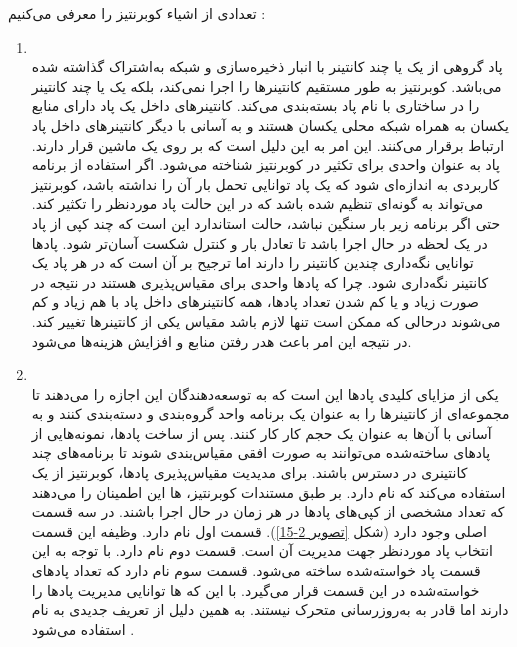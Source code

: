 تعدادی از اشیاء کوبرنتیز را معرفی می‌کنیم \cite{sanche_2018}:
\begin{enumerate}
	\item
	\\
	پاد گروهی از یک یا چند کانتینر با انبار ذخیره‌سازی  و شبکه به‌اشتراک‌ گذاشته‌ شده می‌باشد. کوبرنتیز به طور مستقیم کانتینرها را اجرا نمی‌کند، بلکه یک یا چند کانتینر را  در ساختاری با نام پاد بسته‌بندی می‌کند. کانتینرهای داخل یک پاد دارای منابع یکسان به همراه شبکه محلی یکسان هستند و به آسانی با دیگر کانتینرهای داخل پاد ارتباط برقرار می‌کنند. این امر به این دلیل است که بر روی یک ماشین قرار دارند. پاد به عنوان واحدی برای تکثیر در کوبرنتیز شناخته می‌شود. اگر استفاده از برنامه کاربردی به اندازه‌ای شود که یک پاد توانایی تحمل بار آن را نداشته باشد، کوبرنتیز می‌تواند به گونه‌ای تنظیم شده باشد که در این حالت پاد موردنظر را تکثیر کند. حتی اگر برنامه‌ زیر بار سنگین نباشد، حالت استاندارد این است که چند کپی از پاد در یک لحظه در حال اجرا باشد تا تعادل بار و کنترل شکست آسان‌تر شود.
	پادها توانایی نگه‌داری چندین کانتینر را دارند اما ترجیح بر آن است که در هر پاد یک کانتینر نگه‌داری شود. چرا که پادها واحدی برای مقیاس‌پذیری هستند در نتیجه در صورت زیاد و یا کم‌ شدن تعداد پادها، همه کانتینرهای داخل پاد با هم زیاد و کم می‌شوند در‌حالی که ممکن است تنها لازم باشد مقیاس یکی از کانتینرها تغییر کند. در نتیجه این امر باعث هدر رفتن منابع و افزایش هزینه‌ها می‌شود. 
	
	\item
	\\
	یکی از مزایای کلیدی پادها این است که به توسعه‌دهندگان این اجازه را می‌دهند تا مجموعه‌ای از کانتینرها را به عنوان یک برنامه واحد گروه‌بندی و دسته‌بندی کنند و به آسانی با آن‌ها به عنوان یک حجم کار  کار کنند. پس از ساخت پادها، نمونه‌هایی از پادهای ساخته‌شده می‌توانند به صورت افقی مقیاس‌بندی شوند تا برنامه‌های چند کانتینری در دسترس باشند. برای مدیدیت مقیاس‌پذیری پادها، کوبرنتیز از یک  استفاده می‌کند که  نام دارد.
	بر طبق مستندات کوبرنتیز،  ها این اطمینان را می‌دهند که تعداد مشخصی از کپی‌های پادها در هر زمان در حال اجرا باشند. 
	در 	 سه قسمت اصلی وجود دارد (شکل \ref{تصویر 2-15}). قسمت اول  نام دارد. وظیفه این قسمت انتخاب پاد موردنظر جهت مدیریت آن است. قسمت دوم 	نام دارد.		با توجه به این قسمت پاد خواسته‌شده ساخته می‌شود. قسمت سوم		نام دارد که تعداد پادهای خواسته‌شده در این قسمت قرار می‌گیرد. با این که		ها توانایی مدیریت پادها را دارند اما قادر به به‌روز‌رسانی متحرک نیستند. به همین دلیل از تعریف جدیدی به نام  استفاده می‌شود \cite{nirmata_ReplicaSetsAndDeployments}.
	

\end{enumerate}
